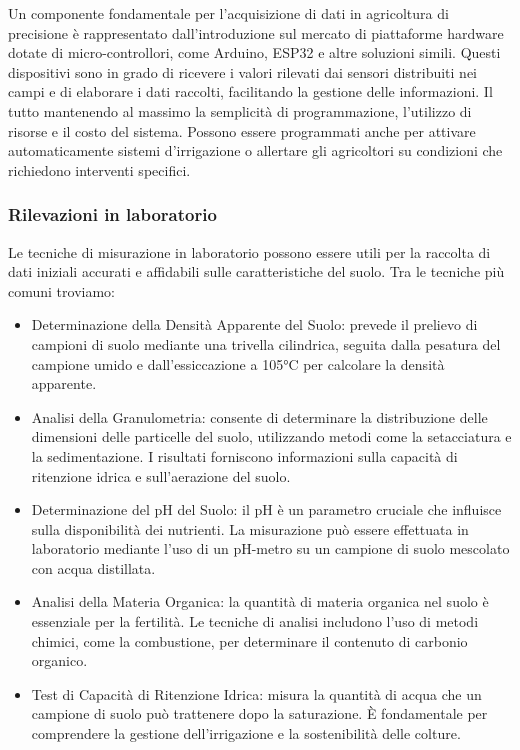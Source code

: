 \documentclass[12pt,a4paper,openright,twoside]{book}
\begin{document}
Un componente fondamentale per l'acquisizione di dati in agricoltura di precisione è rappresentato dall'introduzione sul mercato di piattaforme hardware dotate di micro-controllori, come Arduino, ESP32 e altre soluzioni simili. Questi dispositivi sono in grado di ricevere i valori rilevati dai sensori distribuiti nei campi e di elaborare i dati raccolti, facilitando la gestione delle informazioni. Il tutto mantenendo al massimo la semplicità di programmazione, l'utilizzo di risorse e il costo del sistema. Possono essere programmati anche per attivare automaticamente sistemi d'irrigazione o allertare gli agricoltori su condizioni che richiedono interventi specifici\cite{iot4030012, su16010306}.

\subsubsection{Rilevazioni in laboratorio}

Le tecniche di misurazione in laboratorio possono essere utili per la raccolta di dati iniziali accurati e affidabili sulle caratteristiche del suolo. Tra le tecniche più comuni troviamo:

\begin{itemize}[noitemsep]
    \item Determinazione della Densità Apparente del Suolo: prevede il prelievo di campioni di suolo mediante una trivella cilindrica, seguita dalla pesatura del campione umido e dall'essiccazione a 105°C per calcolare la densità apparente\cite{BULK-DENSITY}.
    \item Analisi della Granulometria: consente di determinare la distribuzione delle dimensioni delle particelle del suolo, utilizzando metodi come la setacciatura e la sedimentazione. I risultati forniscono informazioni sulla capacità di ritenzione idrica e sull'aerazione del suolo\cite{GRANUMETRIC-ANALYSIS}.
    \item Determinazione del pH del Suolo: il pH è un parametro cruciale che influisce sulla disponibilità dei nutrienti. La misurazione può essere effettuata in laboratorio mediante l'uso di un pH-metro su un campione di suolo mescolato con acqua distillata\cite{PH-SOIL}.
    \item Analisi della Materia Organica: la quantità di materia organica nel suolo è essenziale per la fertilità. Le tecniche di analisi includono l'uso di metodi chimici, come la combustione, per determinare il contenuto di carbonio organico\cite{ORGANIC-SOIL}.
    \item Test di Capacità di Ritenzione Idrica: misura la quantità di acqua che un campione di suolo può trattenere dopo la saturazione. È fondamentale per comprendere la gestione dell'irrigazione e la sostenibilità delle colture\cite{WATER-RETENTION-LAB}.
\end{itemize}
\end{document}

